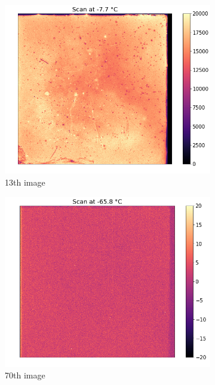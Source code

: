 \begin{figure}[h]
	\begin{subfigure}{0.32\textwidth}
	\centering
	\includegraphics[width=0.95\linewidth]{report_pictures/s12.png}
	\caption{13th image}
	\label{13th}
	\end{subfigure}
	\begin{subfigure}{0.32\textwidth}
	\centering
	\includegraphics[width=0.95\linewidth]{report_pictures/s70.png}
	\caption{70th image}
	\label{70th}
	\end{subfigure}
	\begin{subfigure}{0.32\textwidth}
	\centering

\end{subfigure}
\end{figure}
